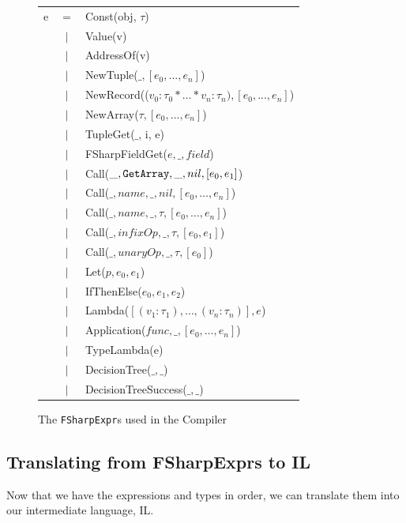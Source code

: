 \begin{figure}[H]
  \centering
  \begin{tabular}{@{}l c l}%
e & $=$ &   Const(obj, $\tau$) \\
 & $\vert$ &   Value(v) \\
 & $\vert$ &   AddressOf(v) \\
 & $\vert$ &   NewTuple($\_, [e_0,...,e_n]$) \\
 & $\vert$ &   NewRecord(($v_0 : \tau_0 * \ldots * v_n : \tau_n), [e_0,...,e_n]$) \\
 & $\vert$ &   NewArray($\tau, [e_0,...,e_n]$) \\
 & $\vert$ &   TupleGet($\_$, i, e) \\
 & $\vert$ &   FSharpFieldGet($e, \_, field$) \\
 & $\vert$ &     Call($\_, \text{\ttfamily GetArray}, \_, nil, [e_0, e_1]$) \\
 & $\vert$ &     Call($\_, name, \_, nil, [e_0, \ldots, e_n]$) \\
 & $\vert$ &     Call($\_, name, \_, \tau, [e_0, \ldots, e_n]$) \\
 & $\vert$ &     Call($\_, infixOp, \_, \tau, [e_0, e_1]$) \\
 & $\vert$ &     Call($\_, unaryOp, \_, \tau, [e_0]$) \\
 & $\vert$ &   Let($p, e_0, e_1$) \\
 & $\vert$ &   IfThenElse($e_0, e_1, e_2$) \\
 & $\vert$ &   Lambda($[(v_1 : \tau_1), \ldots,(v_n : \tau_n)] , e$) \\
 & $\vert$ &   Application($func, \_, [e_0, \ldots, e_n]$) \\
 & $\vert$ &   TypeLambda(e) \\
 & $\vert$ &   DecisionTree($\_, \_$) \\
 & $\vert$ &   DecisionTreeSuccess($\_, \_$) \\
\end{tabular}
\caption{The \texttt{FSharpExpr}s used in the \fshark{}Compiler}
\label{fig:fsharpexprs1}
\end{figure}

\subsection{Translating from FSharpExprs to \fshark{}IL}
Now that we have the \fsharp{} expressions and types in order, we can translate
them into our \fshark{} intermediate language, \fshark{}IL.

